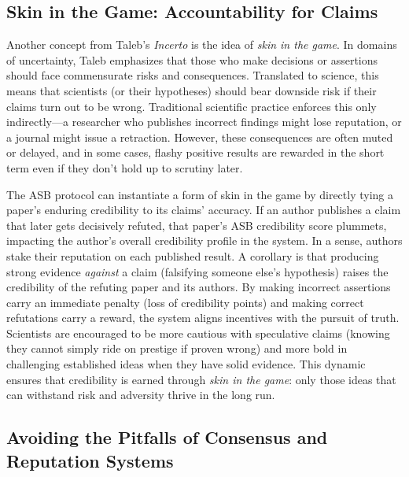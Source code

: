 \documentclass{article}
\begin{document}
\subsection{Skin in the Game: Accountability for Claims}
Another concept from Taleb's \emph{Incerto} is the idea of \emph{skin in the game}\cite{Taleb2018}. In domains of uncertainty, Taleb emphasizes that those who make decisions or assertions should face commensurate risks and consequences. Translated to science, this means that scientists (or their hypotheses) should bear downside risk if their claims turn out to be wrong. Traditional scientific practice enforces this only indirectly---a researcher who publishes incorrect findings might lose reputation, or a journal might issue a retraction. However, these consequences are often muted or delayed, and in some cases, flashy positive results are rewarded in the short term even if they don't hold up to scrutiny later.

The ASB protocol can instantiate a form of skin in the game by directly tying a paper's enduring credibility to its claims' accuracy. If an author publishes a claim that later gets decisively refuted, that paper's ASB credibility score plummets, impacting the author's overall credibility profile in the system. In a sense, authors stake their reputation on each published result. A corollary is that producing strong evidence \emph{against} a claim (falsifying someone else's hypothesis) raises the credibility of the refuting paper and its authors. By making incorrect assertions carry an immediate penalty (loss of credibility points) and making correct refutations carry a reward, the system aligns incentives with the pursuit of truth. Scientists are encouraged to be more cautious with speculative claims (knowing they cannot simply ride on prestige if proven wrong) and more bold in challenging established ideas when they have solid evidence. This dynamic ensures that credibility is earned through \emph{skin in the game}: only those ideas that can withstand risk and adversity thrive in the long run.

\subsection{Avoiding the Pitfalls of Consensus and Reputation Systems}
\end{document}
